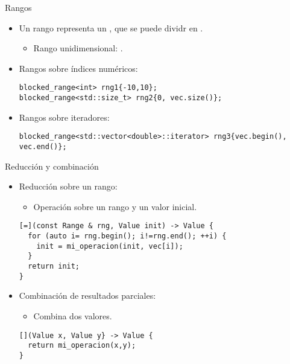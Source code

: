 \begin{frame}[t,fragile]{Rangos}
\begin{itemize}
  \item Un rango representa un , 
        que se puede dividr en .
    \begin{itemize}
      \item Rango unidimensional: .
    \end{itemize}

  \item Rangos sobre índices numéricos:
\begin{lstlisting}
blocked_range<int> rng1{-10,10};
blocked_range<std::size_t> rng2{0, vec.size()};
\end{lstlisting}

  \item Rangos sobre iteradores:
\begin{lstlisting}
blocked_range<std::vector<double>::iterator> rng3{vec.begin(), vec.end()};
\end{lstlisting}

\end{itemize}
\end{frame}

\begin{frame}[t,fragile]{Reducción y combinación}
\begin{itemize}
  \item Reducción sobre un rango:
    \begin{itemize}
      \item Operación sobre un rango y un valor inicial.
    \end{itemize}
\begin{lstlisting}
[=](const Range & rng, Value init) -> Value {
  for (auto i= rng.begin(); i!=rng.end(); ++i) {
    init = mi_operacion(init, vec[i]);
  }
  return init;
}
\end{lstlisting}

  \item Combinación de resultados parciales:
    \begin{itemize}
      \item Combina dos valores.
    \end{itemize}
\begin{lstlisting}
[](Value x, Value y} -> Value {
  return mi_operacion(x,y);
}
\end{lstlisting}
\end{itemize}
\end{frame} 

